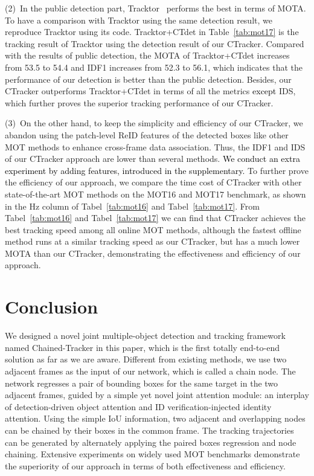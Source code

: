 \documentclass[../arXiv_main.tex]{subfiles}
\newcommand\CRpjl[1]{\textcolor{black}{#1}}
\newcommand\CRwfb[1]{\textcolor{black}{#1}}
\begin{document}
(2)~In the public detection part, Tracktor~\cite{bergmann2019tracking} performs the best in terms of MOTA. To have a comparison with Tracktor using the same detection result, we reproduce Tracktor using its code. Tracktor+CTdet in Table~\ref{tab:mot17} is the tracking result of Tracktor using the detection result of our CTracker. Compared with the results of public detection, the MOTA of Tracktor+CTdet increases from 53.5 to 54.4 and IDF1 increases from 52.3 to 56.1, which indicates that the performance of our detection is better than the public detection. Besides, our CTracker outperforms Tracktor+CTdet in terms of all the metrics \CRwfb{except} IDS, which further proves the superior tracking performance of our CTracker. 

(3)~On the other hand, to keep the simplicity and efficiency of our CTracker, we abandon using the patch-level ReID features of the detected boxes like other MOT methods to enhance cross-frame data association. Thus, the IDF1 and IDS of our CTracker approach are lower than several methods. \CRpjl{We conduct an extra experiment by adding features, introduced in the supplementary.} To further prove the efficiency of our approach, we compare the time cost of CTracker with other state-of-the-art MOT methods on the MOT16 and MOT17 benchmark, as shown in the Hz column of Tabel~\ref{tab:mot16} and Tabel~\ref{tab:mot17}. From Tabel~\ref{tab:mot16} and Tabel~\ref{tab:mot17} we can find that CTracker achieves the best tracking speed among all online MOT methods, although the fastest offline method runs at a similar tracking speed as our CTracker, but has a much lower MOTA than our CTracker, demonstrating the effectiveness and efficiency of our approach. 



\section{Conclusion\label{section:conclusion}}

We designed a novel joint multiple-object detection and tracking framework named Chained-Tracker in this paper, which is the first totally end-to-end solution as far as we are aware. Different from existing methods, we use two adjacent frames as the input of our network, which is called a chain node. The network regresses a pair of bounding boxes for the same target in the two adjacent frames, guided by a simple yet novel joint attention module: an interplay of detection-driven object attention and ID verification-injected identity attention. Using the simple IoU information, two adjacent and overlapping nodes can be chained by their boxes in the common frame. The tracking trajectories can be generated by alternately applying the paired boxes regression and node chaining. Extensive experiments on widely used MOT benchmarks demonstrate the superiority of our approach in terms of both effectiveness and efficiency.




\end{document}
